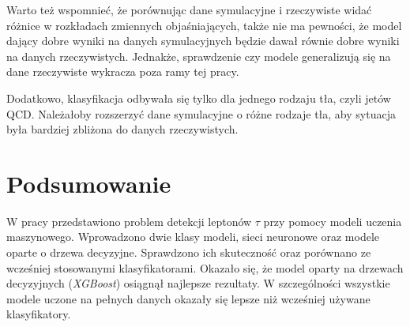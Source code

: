 \documentclass{pracalicmgr}
\begin{document}
	Warto też wspomnieć, że porównując dane symulacyjne i rzeczywiste widać różnice w rozkładach zmiennych objaśniających, także nie ma pewności, że model dający dobre wyniki na danych symulacyjnych będzie dawał równie dobre wyniki na danych rzeczywistych. Jednakże, sprawdzenie czy modele generalizują się na dane rzeczywiste wykracza poza ramy tej pracy.
	
	Dodatkowo, klasyfikacja odbywała się tylko dla jednego rodzaju tła, czyli jetów QCD. Należałoby rozszerzyć dane symulacyjne o różne rodzaje tła, aby sytuacja była bardziej zbliżona do danych rzeczywistych.
	
    \chapter{Podsumowanie}
    
	W pracy przedstawiono problem detekcji leptonów $\tau$ przy pomocy modeli uczenia maszynowego. Wprowadzono dwie klasy modeli, sieci neuronowe oraz modele oparte o drzewa decyzyjne. Sprawdzono ich skuteczność oraz porównano ze wcześniej stosowanymi klasyfikatorami. Okazało się, że model oparty na drzewach decyzyjnych (\textit{XGBoost}) osiągnął najlepsze rezultaty. W szczególności wszystkie modele uczone na pełnych danych okazały się lepsze niż wcześniej używane klasyfikatory.
    
    \printbibliography
    
\end{document}

